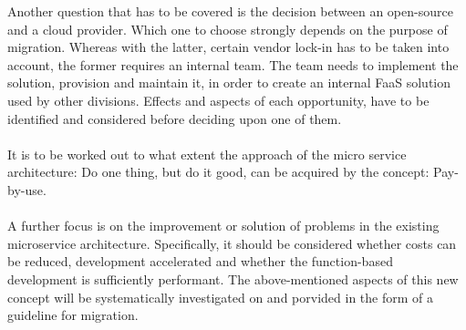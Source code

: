\documentclass[a4paper,11pt, pagesize]{scrartcl}
\begin{document}
\begin{spacing}{1.2}
Another question that has to be covered is the decision between an open-source and a cloud provider. Which one to choose strongly depends on the purpose of migration. Whereas with the latter, certain vendor lock-in has to be taken into account, the former requires an internal team. The team needs to implement the solution, provision and maintain it, in order to create an internal FaaS solution used by other divisions. Effects and aspects of each opportunity, have to be identified and considered before deciding upon one of them. \\\\
It is to be worked out to what extent the approach of the micro service architecture: \glqq Do one thing, but do it good\grqq{}, can be acquired by the concept: \glqq Pay-by-use\grqq{}.\\\\A further focus is on the improvement or solution of problems in the existing microservice architecture. Specifically, it should be considered whether costs can be reduced, development accelerated and whether the function-based development is sufficiently performant. The above-mentioned aspects of this new concept will be systematically investigated on and porvided in the form of a guideline for migration.


\end{spacing}
\end{document}
